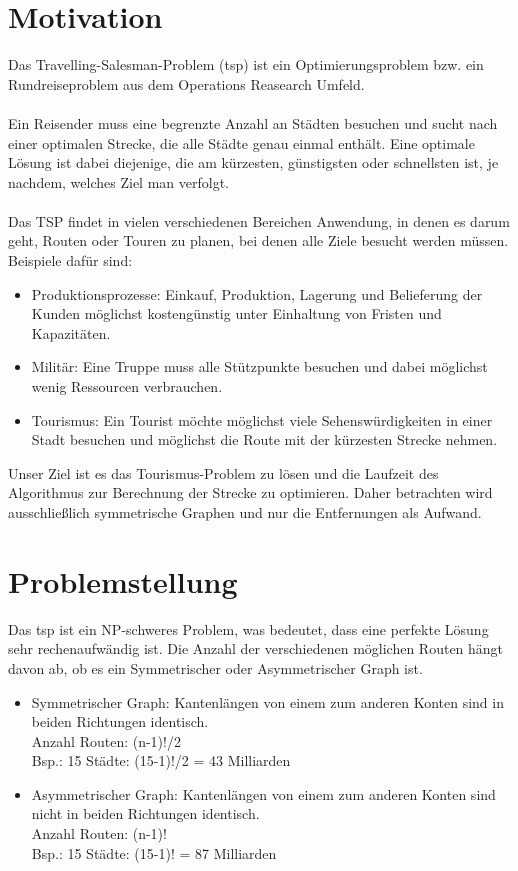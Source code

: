 \section{Motivation}
Das Travelling-Salesman-Problem (\acs*{tsp}) ist ein Optimierungsproblem bzw. ein Rundreiseproblem aus dem Operations Reasearch Umfeld.
\\\\
Ein Reisender muss eine begrenzte Anzahl an Städten besuchen und sucht nach einer optimalen Strecke, die alle Städte genau einmal enthält. 
Eine optimale Lösung ist dabei diejenige, die am kürzesten, günstigsten oder schnellsten ist, je nachdem, welches Ziel man verfolgt. \cite*{TravellingSalesmanProblemProblemHandlungsreisenden}
\\\\
Das TSP findet in vielen verschiedenen Bereichen Anwendung, in denen es darum geht, Routen oder Touren zu planen, bei denen alle Ziele besucht werden müssen. \\
Beispiele dafür sind:
\begin{itemize}
    \item Produktionsprozesse:
            Einkauf, Produktion, Lagerung und Belieferung der Kunden möglichst kostengünstig unter Einhaltung von Fristen und Kapazitäten.
    \item Militär:
            Eine Truppe muss alle Stützpunkte besuchen und dabei möglichst wenig Ressourcen verbrauchen. 
    \item Tourismus:
            Ein Tourist möchte möglichst viele Sehenswürdigkeiten in einer Stadt besuchen und möglichst die Route mit der kürzesten Strecke nehmen.
\end{itemize}

\noindent Unser Ziel ist es das Tourismus-Problem zu lösen und die Laufzeit des Algorithmus zur Berechnung der Strecke zu optimieren.
Daher betrachten wird ausschließlich symmetrische Graphen und nur die Entfernungen als Aufwand.

\section{Problemstellung}
Das \acs*{tsp} ist ein NP-schweres Problem, was bedeutet, dass eine perfekte Lösung sehr rechenaufwändig ist. 
Die Anzahl der verschiedenen möglichen Routen hängt davon ab, ob es ein Symmetrischer oder Asymmetrischer Graph ist.\cite*{gmbhTravelingSalesmanProblemOperationsResearch}

\begin{itemize}
    \item Symmetrischer Graph: Kantenlängen von einem zum anderen Konten sind in beiden Richtungen identisch.\\
            Anzahl Routen: (n-1)!/2\\
            Bsp.:   15 Städte: (15-1)!/2 = 43 Milliarden
    \item Asymmetrischer Graph: Kantenlängen von einem zum anderen Konten sind nicht in beiden Richtungen identisch.\\
            Anzahl Routen: (n-1)!\\
            Bsp.:   15 Städte: (15-1)! = 87 Milliarden
\end{itemize}

